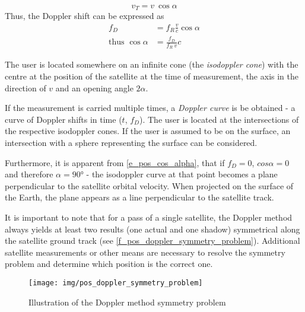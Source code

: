 \begin{equation*}
    v_T = v \ \cos{\alpha}
\end{equation*}
Thus, the Doppler shift can be expressed as
\begin{align}
    \label{e_pos_fd_alpha}
    f_D &= f_R \frac{v}{c} \cos{\alpha} \\
    \label{e_pos_cos_alpha}
    \text{thus } \cos{\alpha} &= \frac{f_D}{f_R \ v}c
\end{align}

The user is located somewhere on an infinite cone (the \textit{isodoppler cone}) with the centre at the position of the satellite at the time of measurement, the axis in the direction of $v$ and an opening angle $2\alpha$.

If the measurement is carried multiple times, a \textit{Doppler curve} is be obtained - a curve of Doppler shifts in time ($t$, $f_D$). The user is located at the intersections of the respective isodoppler cones. If the user is assumed to be on the surface, an intersection with a sphere representing the surface can be considered.

Furthermore, it is apparent from \autoref{e_pos_cos_alpha}, that if $f_D = 0$, $cos \alpha = 0$ and therefore $\alpha = \ang{90}$ - the isodoppler curve at that point becomes a plane perpendicular to the satellite orbital velocity. When projected on the surface of the Earth, the plane appears as a line perpendicular to the satellite track.

It is important to note that for a pass of a single satellite, the Doppler method always yields at least two results (one actual and one shadow) symmetrical along the satellite ground track (see \autoref{f_pos_doppler_symmetry_problem}). Additional satellite measurements or other means are necessary to resolve the symmetry problem and determine which position is the correct one.

\begin{figure}
    \centering
    \texttt{[image: img/pos\_doppler\_symmetry\_problem]}
    \caption{Illustration of the Doppler method symmetry problem\cite{sop09}}
    \label{f_pos_doppler_symmetry_problem}
\end{figure}



